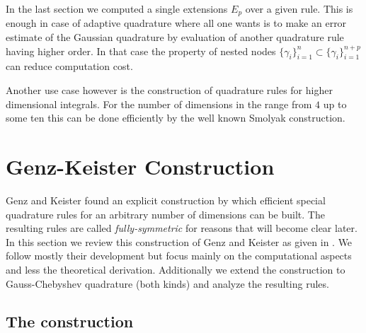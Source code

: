 \documentclass[a4paper,10pt]{article}
\begin{document}
In the last section we computed a single extensions $E_p$ over a
given rule. This is enough in case of adaptive quadrature where all one
wants is to make an error estimate of the Gaussian quadrature by evaluation
of another quadrature rule having higher order. In that case the property of
nested nodes $\{\gamma_i\}_{i=1}^n \subset \{\gamma_i\}_{i=1}^{n+p}$ can reduce
computation cost.

Another use case however is the construction of quadrature
rules for higher dimensional integrals. For the number of dimensions in the
range from $4$ up to some ten this can be done efficiently by the well known
Smolyak construction.







\FloatBarrier
\section{Genz-Keister Construction}


Genz and Keister found an explicit construction by which efficient
special quadrature rules for an arbitrary number
of dimensions can be built. The resulting rules are
called \emph{fully-symmetric} for reasons that will become
clear later. In this section we review this construction of Genz
and Keister as given in \cite{genz, genz_keister}. We follow mostly their
development but focus mainly on the computational aspects and less
the theoretical derivation. Additionally we extend the construction
to Gauss-Chebyshev quadrature (both kinds) and analyze the resulting rules.


\subsection{The construction}
\end{document}
